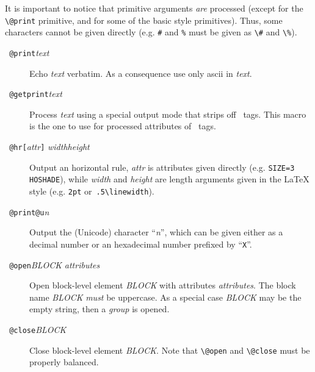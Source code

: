 It is important to notice that primitive arguments \emph{are}
processed (except for the \verb+\@print+ primitive, and for some of
the basic style primitives). Thus,
some characters cannot be given directly (e.g. \verb+#+ and
\verb+%+ must be given as \verb+\#+ and \verb+\%+).
\begin{description}
\item[{\tt{} @print}{\it text}{\tt{}}]
Echo \textit{text} verbatim. As a consequence use only ascii
in \textit{text}.
\item[{\tt{} @getprint}{\it text}{\tt{}}]
Process \textit{text} using a special output mode that strips off
\html~tags. This macro is the one to use for processed attributes of
\html~tags.
\item[{\tt{} @hr[}{\it attr}{\tt]}{\it
width}{\tt{}}{\it height}{\tt{}}]
Output an \html{} horizontal rule, \textit{attr} is attributes given
directly (e.g. \verb+SIZE=3 HOSHADE+), while \textit{width} and
\textit{height} are length arguments given in the \LaTeX{} style
(e.g. \verb+2pt+ or~\verb+.5\linewidth+).
\item[{\tt{} @print@u}{\it n}{\tt{}}]
Output the (Unicode) character ``\textit{n}'', which can
be given either as a decimal number or an hexadecimal number prefixed
by ``\texttt{X}''.

\item[{\tt{} @open}{\it BLOCK}{\tt{}}{\it
attributes}{\tt{}}]
Open \html{} block-level element \textit{BLOCK} with attributes
\textit{attributes}. The block name \textit{BLOCK} \emph{must} be
uppercase.
As a special case \textit{BLOCK} may be the empty string, then a \html{}
\emph{group} is opened.
\item[{\tt{} @close}{\it BLOCK}{\tt{}}]
Close \html{} block-level element \textit{BLOCK}.
Note that \verb+\@open+ and \verb+\@close+ must be properly balanced.
\end{description}

